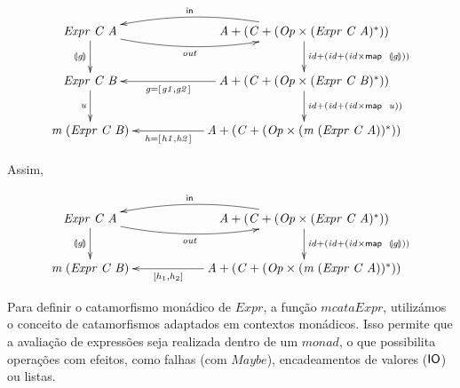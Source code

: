\documentclass[11pt, a4paper, fleqn]{article}
\newcommand{\Conid}[1]{\mathit{#1}}
\newcommand{\Varid}[1]{\mathit{#1}}
\begin{document}
\begin{eqnarray*}
\xymatrix@C=2cm{
    \ensuremath{\Conid{Expr}\;\Conid{C}\;\Conid{A}}
           \ar[d]_-{\ensuremath{\cataNat{\Varid{g}}}}
           \ar@/^-1pc/[r]_-{\ensuremath{\Varid{out}}}
&
    \ensuremath{\Conid{A}\mathbin{+}(\Conid{C}\mathbin{+}(\Conid{Op}\times(\Conid{Expr}\;\Conid{C}\;\Conid{A})}^*))
           \ar[d]^{\ensuremath{\Varid{id}\mathbin{+}(\Varid{id}\mathbin{+}(\Varid{id}\times\map \;\cataNat{\Varid{g}}))}}
           \ar@/^-1pc/[l]_-{\ensuremath{\mathsf{in}}}
\\
    \ensuremath{\Conid{Expr}\;\Conid{C}\;\Conid{B}}
           \ar[d]_-{\ensuremath{\Varid{u}}}
&
    \ensuremath{\Conid{A}\mathbin{+}(\Conid{C}\mathbin{+}(\Conid{Op}\times(\Conid{Expr}\;\Conid{C}\;\Conid{B})}^*))
           \ar[l]^-{\ensuremath{\Varid{g}\mathrel{=}[\mskip1.5mu \Varid{g1},\Varid{g2}\mskip1.5mu]}}
           \ar[d]^{\ensuremath{\Varid{id}\mathbin{+}(\Varid{id}\mathbin{+}(\Varid{id}\times\map \;\Varid{u}))}}
\\
    \ensuremath{\Varid{m}\;(\Conid{Expr}\;\Conid{C}\;\Conid{B})}
&
    \ensuremath{\Conid{A}\mathbin{+}(\Conid{C}\mathbin{+}(\Conid{Op}\times(\Varid{m}\;(\Conid{Expr}\;\Conid{C}\;\Conid{A}))}^*))
            \ar[l]^-{\ensuremath{\Varid{h}\mathrel{=}[\mskip1.5mu \Varid{h1},\Varid{h2}\mskip1.5mu]}}
}
\end{eqnarray*}

Assim,

\begin{eqnarray*}
\xymatrix@C=2cm{
    \ensuremath{\Conid{Expr}\;\Conid{C}\;\Conid{A}}
           \ar[d]_-{\ensuremath{\cataNat{\Varid{g}}}}
           \ar@/^-1pc/[r]_-{\ensuremath{\Varid{out}}}
&
    \ensuremath{\Conid{A}\mathbin{+}(\Conid{C}\mathbin{+}(\Conid{Op}\times(\Conid{Expr}\;\Conid{C}\;\Conid{A})}^*))
           \ar[d]^{\ensuremath{\Varid{id}\mathbin{+}(\Varid{id}\mathbin{+}(\Varid{id}\times\map \;\cataNat{\Varid{g}}))}}
           \ar@/^-1pc/[l]_-{\ensuremath{\mathsf{in}}}
\\
    \ensuremath{\Varid{m}\;(\Conid{Expr}\;\Conid{C}\;\Conid{B})}
&
    \ensuremath{\Conid{A}\mathbin{+}(\Conid{C}\mathbin{+}(\Conid{Op}\times(\Varid{m}\;(\Conid{Expr}\;\Conid{C}\;\Conid{A}))}^*))
            \ar[l]^-{[h_1, h_2]}
}
\end{eqnarray*}


Para definir o catamorfismo monádico de \ensuremath{\Conid{Expr}}, a função \ensuremath{\Varid{mcataExpr}}, utilizámos o conceito de catamorfismos 
adaptados em contextos monádicos. Isso permite que a avaliação de expressões seja realizada dentro de um \ensuremath{\Varid{monad}}, 
o que possibilita operações com efeitos, como falhas (com \ensuremath{\Conid{Maybe}}), encadeamentos de valores (\ensuremath{\fun{IO}}) ou listas.
\end{document}
